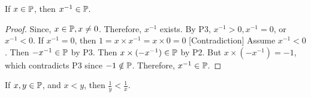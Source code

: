 \documentclass[11pt]{article}
\begin{document}
\begin{proposition}
    If \(x \in \mathbb P\), then \(x^{-1} \in \mathbb P \).
\end{proposition}
\begin{proof}
    Since, \(x \in \mathbb P, x \neq 0\). Therefore, \(x^{-1}\) exists. By P3, \(x^{-1} > 0, x^{-1} = 0  \), or \(x^{-1} < 0\).
If \(x^{-1} = 0\), then \(1 = x \times x^{-1} = x \times 0 = 0\)
    [Contradiction] Assume \(x^{-1} < 0\). Then \(-x^{-1} \in \mathbb P\) by P3. Then \(x
    \times (-x^{-1}) \in \mathbb P\) by P2. But \(x \times (-x^{-1}) = -1\), which
    contradicts P3 since \(-1 \notin \mathbb P\). Therefore, \(x^{-1} \in \mathbb P\).
\end{proof}
\begin{corollary}
    If \(x, y \in \mathbb P\), and \(x < y\), then \(\frac{1}{y} < \frac{1}{x}\).
\end{corollary}
\end{document}

